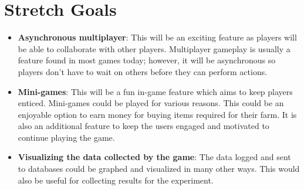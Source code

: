 \documentclass{article}
\begin{document}
\section{Stretch Goals}
\begin{itemize}
    \item \textbf{Asynchronous multiplayer}: This will be an exciting feature as players will be able to collaborate with other players. Multiplayer gameplay is usually a feature found in most games today; however, it will be asynchronous so players don't have to wait on others before they can perform actions.
    \item \textbf{Mini-games}: This will be a fun in-game feature which aims to keep players enticed. Mini-games could be played for various reasons. This could be an enjoyable option to earn money for buying items required for their farm. It is also an additional feature to keep the users engaged and motivated to continue playing the game.
    \item \textbf{Visualizing the data collected by the game}: The data logged and sent to databases could be graphed and visualized in many other ways. This would also be useful for collecting results for the experiment.
\end{itemize}
\end{document}
